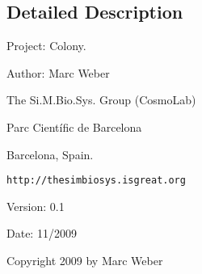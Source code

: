\subsection{Detailed Description}
Project: Colony. 

\begin{Desc}
\item[Author:]Marc Weber\par
 The Si.M.Bio.Sys. Group (CosmoLab)\par
 Parc Científic de Barcelona\par
 Barcelona, Spain.\par
 {\tt http://thesimbiosys.isgreat.org} \end{Desc}
\begin{Desc}
\item[Version:]0.1 \end{Desc}
\begin{Desc}
\item[Date:]11/2009\end{Desc}
Copyright 2009 by Marc Weber 